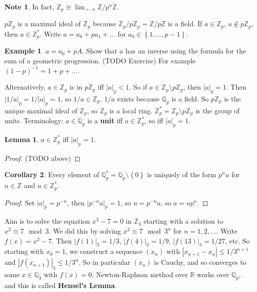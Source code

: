 \documentclass{article}
\newcommand{\Z}{\mathbb{Z}}
\newcommand{\Q}{\mathbb{Q}}
\newcommand{\R}{\mathbb{R}}
\newcommand{\rb}[1]{\left( #1 \right)}
\newcommand{\cb}[1]{\left\{ #1 \right\}}
\newcommand{\abs}[1]{\left\lvert #1 \right\rvert}
\theoremstyle{definition}\newtheorem{definition}{Definition}[section]
\theoremstyle{definition}\newtheorem{remark}[definition]{Remark}
\theoremstyle{definition}\newtheorem*{example}{Example}
\theoremstyle{definition}\newtheorem*{note}{Note}
\newtheorem{lemma}[definition]{Lemma}
\newtheorem{corollary}[definition]{Corollary}
\begin{document}
\begin{note}
In fact, $ \Z_p \cong \lim_{\leftarrow n} \Z / p^n\Z $.
\end{note}

$ p\Z_p $ is a maximal ideal of $ \Z_p $ because $ \Z_p / p\Z_p = \Z / p\Z $ is a field. If $ a \in \Z_p $, $ a \notin p\Z_p $, then $ a \in \Z_p^* $. Write $ a = a_0 + pa_1 + \dots $ for $ a_0 \in \cb{1, \dots, p - 1} $.

\begin{example}
$ a = a_0 + pA $. Show that $ a $ has an inverse using the formula for the sum of a geometric progression. (TODO Exercise) For example $ \rb{1 - p}^{-1} = 1 + p + \dots $.
\end{example}

Alternatively, $ a \in \Z_p $ is in $ p\Z_p $ iff $ \abs{a}_p < 1 $. So if $ a \in \Z_p \setminus p\Z_p $, then $ \abs{a}_p = 1 $. Then $ \abs{1 / a}_p = 1 / \abs{a}_p = 1 $, so $ 1 / a \in \Z_p $. $ 1 / a $ exists because $ \Q_p $ is a field. So $ p\Z_p $ is the unique maximal ideal of $ \Z_p $, so $ \Z_p $ is a local ring. $ \Z_p^* = \Z_p \setminus p\Z_p $ is the group of units. Terminology: $ a \in \Q_p $ is a \textbf{unit} iff $ a \in \Z_p^* $, so iff $ \abs{a}_p = 1 $.

\begin{lemma}
$ a \in \Z_p^* $ iff $ \abs{a}_p = 1 $.
\end{lemma}

\begin{proof}
(TODO above)
\end{proof}

\begin{corollary}
Every element of $ \Q_p^* = \Q_p \setminus \cb{0} $ is uniquely of the form $ p^nu $ for $ n \in \Z $ and $ u \in \Z_p^* $.
\end{corollary}

\begin{proof}
Set $ \abs{a}_p = p^{-n} $, then $ \abs{p^{-n}a}_p = 1 $, so $ u = p^{-n}a $, so $ a = up^n $.
\end{proof}

Aim is to solve the equation $ x^2 - 7 = 0 $ in $ \Z_3 $ starting with a solution to $ x^2 \equiv 7 \mod 3 $. We did this by solving $ x^2 \equiv 7 \mod 3^n $ for $ n = 1, 2, \dots $. Write $ f\rb{x} = x^2 - 7 $. Then $ \abs{f\rb{1}}_3 = 1 / 3 $, $ \abs{f\rb{4}}_3 = 1 / 9 $, $ \abs{f\rb{13}}_3 = 1 / 27 $, etc. So starting with $ x_0 = 1 $, we construct a sequence $ \rb{x_n} $ with $ \abs{x_{n + 1} - x_n} \le 1 / 3^{n + 1} $ and $ \abs{f\rb{x_{n + 1}}}_3 \le 1 / 3^n $. So in particular $ \rb{x_n} $ is Cauchy, and so converges to some $ x \in \Q_3 $ with $ f\rb{x} = 0 $. Newton-Raphson method over $ \R $ works over $ \Q_p $, and this is called \textbf{Hensel's Lemma}.
\end{document}

